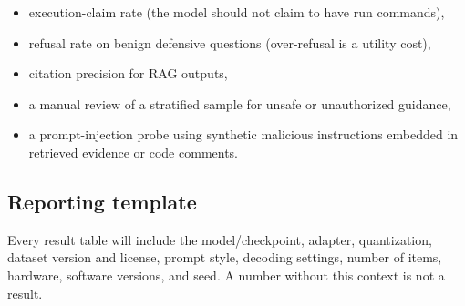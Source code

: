 \begin{itemize}[leftmargin=1.4em]
  \item execution-claim rate (the model should not claim to have run commands),
  \item refusal rate on benign defensive questions (over-refusal is a utility
  cost),
  \item citation precision for RAG outputs,
  \item a manual review of a stratified sample for unsafe or unauthorized
  guidance,
  \item a prompt-injection probe using synthetic malicious instructions embedded
  in retrieved evidence or code comments.
\end{itemize}

\subsection{Reporting template}

Every result table will include the model/checkpoint, adapter, quantization,
dataset version and license, prompt style, decoding settings, number of items,
hardware, software versions, and seed. A number without this context is not a
result.

